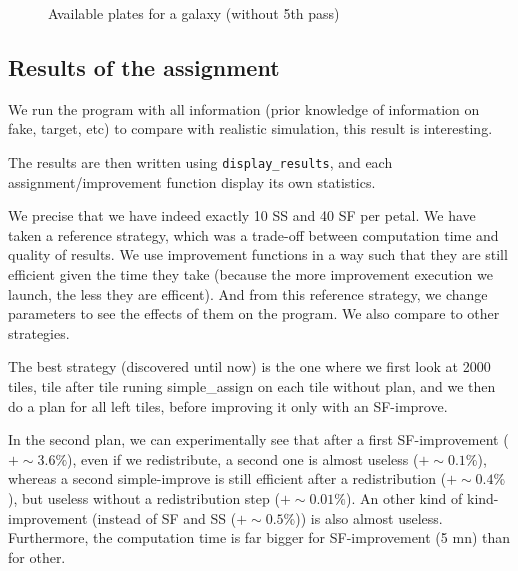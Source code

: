 \documentclass{extarticle}
\begin{document}
\begin{figure}[H]\begin{center}
\caption{Available plates for a galaxy (without 5th pass)}\label{reachplate}
\end{center}\end{figure}


\subsection{Results of the assignment}
We run the program with all information (prior knowledge of information on fake, target, etc) to compare with realistic simulation, this result is interesting.

The results are then written using {\tt display\_results}, and each assignment/improvement function display its own statistics.

We precise that we have indeed exactly 10 SS and 40 SF per petal. We have taken a reference strategy, which was a trade-off between computation time and quality of results. We use improvement functions in a way such that they are still efficient given the time they take (because the more improvement execution we launch, the less they are efficent). And from this reference strategy, we change parameters to see the effects of them on the program. We also compare to other strategies. 

The best strategy (discovered until now) is the one where we first look at 2000 tiles, tile after tile runing simple\_assign on each tile without plan, and we then do a plan for all left tiles, before improving it only with an SF-improve.

In the second plan, we can experimentally see that after a first SF-improvement ($+\sim 3.6\%$), even if we redistribute, a second one is almost useless ($+\sim 0.1\%$), whereas a second simple-improve is still efficient after a redistribution ($+\sim 0.4\%$), but useless without a redistribution step ($+\sim 0.01\%$). An other kind of kind-improvement (instead of SF and SS ($+\sim 0.5\%$)) is also almost useless. Furthermore, the computation time is far bigger for SF-improvement (5 mn) than for other.
\end{document}
